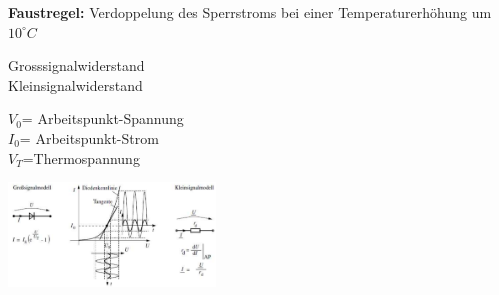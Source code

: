                 {\bf Faustregel:} Verdoppelung des Sperrstroms bei einer Temperaturerh\"ohung um $10 ^\circ C$
            
            \begin{minipage}[T]{8.5cm}
                Grosssignalwiderstand
                \hspace{8mm}\\
                Kleinsignalwiderstand
                \hspace{8.4mm}\\
            \end{minipage}
            \begin{minipage}{5cm}
                $V_0$= Arbeitspunkt-Spannung\\
                $I_0$= Arbeitspunkt-Strom\\
                $V_T$=Thermospannung
            \end{minipage}
            \begin{minipage}{5.5cm}
                \includegraphics[width=5.5cm]{./bilder/GrossKleinSig}\\
            \end{minipage}
\newpage            


